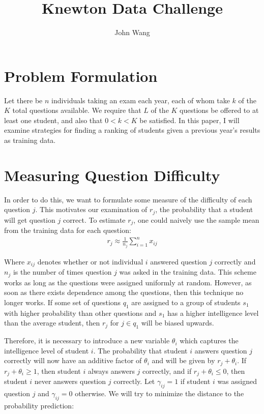\documentclass[psamsfonts]{amsart}
\title{Knewton Data Challenge}
\author{John Wang}
\begin{document}
\maketitle

\section{Problem Formulation}

Let there be $n$ individuals taking an exam each year, each of whom take $k$ of the $K$ total questions available. We require that $L$ of the $K$ questions be offered to at least one student, and also that $0 < k < K$ be satisfied. In this paper, I will examine strategies for finding a ranking of students given a previous year's results as training data.

\section{Measuring Question Difficulty}

In order to do this, we want to formulate some measure of the difficulty of each question $j$. This motivates our examination of $r_j$, the probability that a student will get question $j$ correct. To estimate $r_j$, one could naively use the sample mean from the training data for each question:
\begin{eqnarray}
r_j \approx \frac{1}{n_j} \sum_{i=1}^n x_{ij}
\end{eqnarray}

Where $x_{ij}$ denotes whether or not individual $i$ answered question $j$ correctly and $n_j$ is the number of times question $j$ was asked in the training data. This scheme works as long as the questions were assigned uniformly at random. However, as soon as there exists dependence among the questions, then this technique no longer works. If some set of questions $q_1$ are assigned to a group of students $s_1$ with higher probability than other questions and $s_1$ has a higher intelligence level than the average student, then $r_j$ for $j \in q_1$ will be biased upwards. 

Therefore, it is necessary to introduce a new variable $\theta_i$ which captures the intelligence level of student $i$. The probability that student $i$ answers question $j$ correctly will now have an additive factor of $\theta_i$ and will be given by $r_j + \theta_i$. If $r_j + \theta_i \geq 1$, then student $i$ always answers $j$ correctly, and if $r_j + \theta_i \leq 0$, then student $i$ never answers question $j$ correctly. Let $\gamma_{ij} = 1$ if student $i$ was assigned question $j$ and $\gamma_{ij} = 0$ otherwise. We will try to minimize the distance to the probability prediction:
\end{document}
